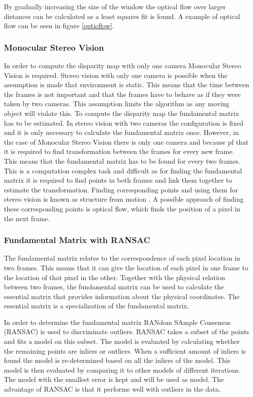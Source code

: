\documentclass[a4paper]{article}
\begin{document}
By gradually increasing the size of the window the optical flow over larger distances can be calculated as a least squares fit is found. A example of optical flow can be seen in figure \ref{opticflow}.

\subsubsection{Monocular Stereo Vision}
In order to compute the disparity map with only one camera Monocular Stereo Vision is required. Stereo vision with only one camera is possible when the assumption is made that environment is static. This means that the time between the frames is not important and that the frames have to behave as if they were taken by two cameras. This assumption limits the algorithm as any moving object will violate this. To compute the disparity map the fundamental matrix has to be estimated. In stereo vision with two cameras the configuration is fixed and it is only necessary to calculate the fundamental matrix once.  However, in the case of Monocular Stereo Vision there is only one camera and because pf that it is required to find transformation between the frames for every new frame. This means that the fundamental matrix has to be found for every two frames. This is a computation complex task and difficult as for finding the fundamental matrix it is required to find points in both frames and link them together to estimate the transformation. Finding corresponding points and using them for stereo vision is known as structure from motion \cite{Varga2005}. A possible approach of finding these corresponding points is optical flow, which finds the position of a pixel in the next frame.

\subsubsection{Fundamental Matrix with RANSAC}

The fundamental matrix relates to the correspondence of each pixel location in two frames. This means that it can give the location of each pixel in one frame to the location of that pixel in the other. Together with the physical relation between two frames, the fundamental matrix can be used to calculate the essential matrix \cite{Hartley2004} that provides information about the physical coordinates. The essential matrix is a specialization of the fundamental matrix. 

In order to determine the fundamental matrix RANdom SAmple Consensus (RANSAC) is used to discriminate outliers. RANSAC takes a subset of the points and fits a model on this subset. The model is evaluated by calculating whether the remaining points are inliers or outliers. When a sufficient amount of inliers is found the model is re-determined based on all the inliers of the model. This model is then evaluated by comparing it to other models of different iterations. The model with the smallest error is kept and will be used as model. The advantage of RANSAC is that it performs well with outliers in the data.
\end{document}
